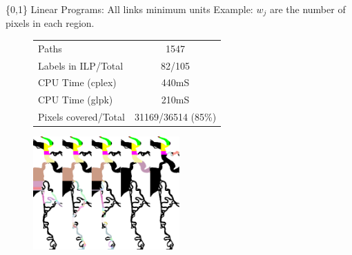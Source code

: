 \documentclass{beamer}
\begin{document}
\begin{frame}{\{0,1\} Linear Programs: All links minimum units}
Example: $w_j$ are the number of pixels in each region.
\begin{figure}
  \begin{tabular}{|l|c|}
  \hline 
  Paths & 1547 \\
  Labels in ILP/Total & 82/105 \\
  CPU Time (cplex) & 440mS\\
  CPU Time (glpk) & 210mS \\
  Pixels covered/Total & 31169/36514 (85\%)\\
  \hline
  \end{tabular}
\end{figure}

  \begin{figure}
     {\includegraphics[width=0.5\textwidth]{figures/max_coverage_fixed_units_paths.png}}
  \end{figure}
\end{frame}
\end{document}
